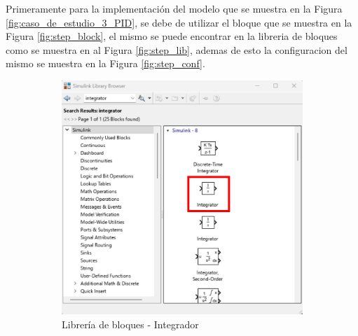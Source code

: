 Primeramente para la implementación del modelo que se muestra en la Figura \ref{fig:caso_de_estudio_3_PID}, se debe de utilizar el bloque que se muestra en la Figura \ref{fig:step_block}, el mismo se puede encontrar en la libreria de bloques como se muestra en al Figura \ref{fig:step_lib}, ademas de esto la configuracion del mismo se muestra en la Figura \ref{fig:step_conf}.

\begin{figure}[htbp]
    \centering
    \begin{subfigure}[b]{0.35\textwidth}
        \centering
        \includegraphics[width=\textwidth]{fig/Capitulo5/Caso_de_estudio_PID/lib_integrator.pdf}
        \caption{Librería de bloques - Integrador}
        \label{fig:int_PID_lib}
    \end{subfigure}
    \hfill
    \begin{subfigure}[b]{0.45\textwidth}
        \centering

\end{subfigure}
\end{figure}
